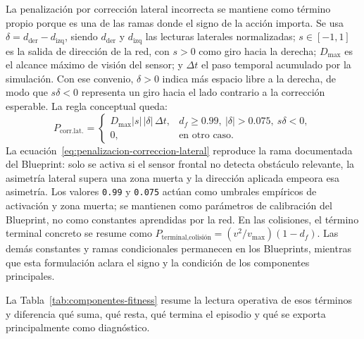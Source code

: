 La penalización por corrección lateral incorrecta se mantiene como término propio porque es una de las ramas donde el signo de la acción importa. Se usa \(\delta=d_{\text{der}}-d_{\text{izq}}\), siendo \(d_{\text{der}}\) y \(d_{\text{izq}}\) las lecturas laterales normalizadas; \(s\in[-1,1]\) es la salida de dirección de la red, con \(s>0\) como giro hacia la derecha; \(D_{\max}\) es el alcance máximo de visión del sensor; y \(\Delta t\) el paso temporal acumulado por la simulación. Con ese convenio, \(\delta>0\) indica más espacio libre a la derecha, de modo que \(s\delta<0\) representa un giro hacia el lado contrario a la corrección esperable. La regla conceptual queda:
\begin{equation}
\label{eq:penalizacion-correccion-lateral}
P_{\text{corr.lat.}} =
\begin{cases}
D_{\max}|s|\,|\delta|\,\Delta t, & d_f \ge 0\mathord{.}99,\ |\delta|>0\mathord{.}075,\ s\delta<0,\\
0, & \text{en otro caso.}
\end{cases}
\end{equation}
La ecuación~\ref{eq:penalizacion-correccion-lateral} reproduce la rama documentada del Blueprint: solo se activa si el sensor frontal no detecta obstáculo relevante, la asimetría lateral supera una zona muerta y la dirección aplicada empeora esa asimetría. Los valores \texttt{0.99} y \texttt{0.075} actúan como umbrales empíricos de activación y zona muerta; se mantienen como parámetros de calibración del Blueprint, no como constantes aprendidas por la red. En las colisiones, el término terminal concreto se resume como \(P_{\text{terminal,colisión}}=(v^2/v_{\max})(1-d_f)\). Las demás constantes y ramas condicionales permanecen en los Blueprints, mientras que esta formulación aclara el signo y la condición de los componentes principales.

La Tabla~\ref{tab:componentes-fitness} resume la lectura operativa de esos términos y diferencia qué suma, qué resta, qué termina el episodio y qué se exporta principalmente como diagnóstico.

